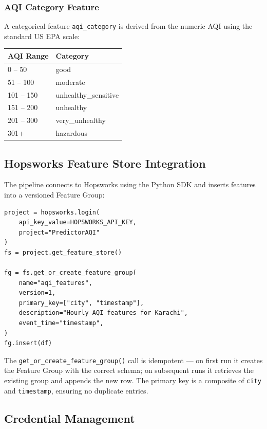 \documentclass[conference]{IEEEtran}
\begin{document}
\subsubsection{AQI Category Feature}
A categorical feature \texttt{aqi\_category} is derived from the numeric AQI using the standard US EPA scale:

\begin{center}
\begin{tabular}{|l|l|}
\hline
\textbf{AQI Range} & \textbf{Category} \\
\hline
0 -- 50 & good \\
51 -- 100 & moderate \\
101 -- 150 & unhealthy\_sensitive \\
151 -- 200 & unhealthy \\
201 -- 300 & very\_unhealthy \\
301+ & hazardous \\
\hline
\end{tabular}
\end{center}

\subsection{Hopsworks Feature Store Integration}

The pipeline connects to Hopsworks using the Python SDK and inserts features into a versioned Feature Group:

\begin{lstlisting}
project = hopsworks.login(
    api_key_value=HOPSWORKS_API_KEY,
    project="PredictorAQI"
)
fs = project.get_feature_store()

fg = fs.get_or_create_feature_group(
    name="aqi_features",
    version=1,
    primary_key=["city", "timestamp"],
    description="Hourly AQI features for Karachi",
    event_time="timestamp",
)
fg.insert(df)
\end{lstlisting}

The \texttt{get\_or\_create\_feature\_group()} call is idempotent — on first run it creates the Feature Group with the correct schema; on subsequent runs it retrieves the existing group and appends the new row. The primary key is a composite of \texttt{city} and \texttt{timestamp}, ensuring no duplicate entries.

\subsection{Credential Management}
\end{document}
